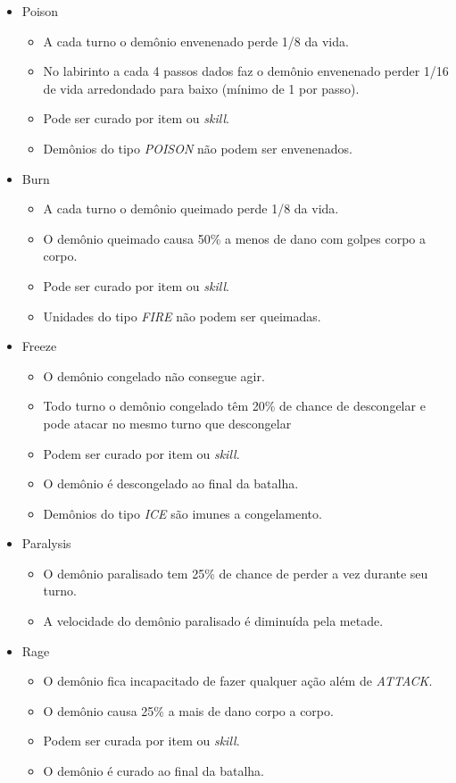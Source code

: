 \documentclass[
	12pt,				%
	openright,			%
	twoside,			%
	a4paper,			%
	english,			%
	french,				%
	spanish,			%
	brazil				%
	]{abntex2}
\begin{document}
\begin{itemize}
\item Poison
	\begin{itemize}
	\item A cada turno o demônio envenenado perde 1/8 da vida.
	\item No labirinto a cada 4 passos dados faz o demônio envenenado perder 1/16 de vida arredondado para baixo (mínimo de 1 por passo).
	\item Pode ser curado por item ou \emph{skill}.
	\item Demônios do tipo \emph{POISON} não podem ser envenenados.
	\end{itemize}
\item Burn
	\begin{itemize}
	\item A cada turno o demônio queimado perde 1/8 da vida.
	\item O demônio queimado causa 50\% a menos de dano com golpes corpo a corpo.
	\item Pode ser curado por item ou \emph{skill}.
	\item Unidades do tipo \emph{FIRE} não podem ser queimadas.
	\end{itemize}
\item Freeze
	\begin{itemize}
	\item O demônio congelado não consegue agir.
	\item Todo turno o demônio congelado têm 20\% de chance de descongelar e pode atacar no mesmo turno que descongelar
	\item Podem ser curado por item ou \emph{skill}.
	\item O demônio é descongelado ao final da batalha.
	\item Demônios do tipo \emph{ICE} são imunes a congelamento.
	\end{itemize}
\item Paralysis
	\begin{itemize}
	\item O demônio paralisado tem 25\% de chance de perder a vez durante seu turno.
	\item A velocidade do demônio paralisado é diminuída pela metade. 
	\end{itemize}
\item Rage
	\begin{itemize}
	\item O demônio fica incapacitado de fazer qualquer ação além de \emph{ATTACK}.
	\item O demônio causa 25\% a mais de dano corpo a corpo.
	\item Podem ser curada por item ou \emph{skill}.
	\item O demônio é curado ao final da batalha.
	\end{itemize}
\end{itemize}
\end{document}

